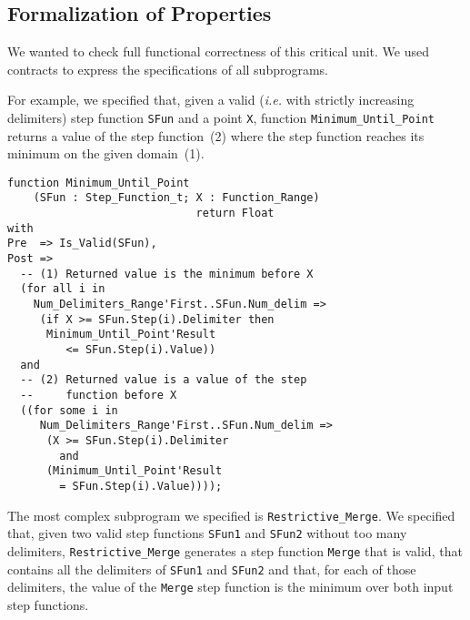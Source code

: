 \documentclass[10pt,a4paper,twocolumn]{article}
\newcommand{\ie}{\textit{i.e.}\xspace}
\newcommand{\SPARK}[1]{\lstinline[language=Ada,basicstyle={\footnotesize
      \sffamily},framesep=0pt]$#1$}
\begin{document}
\subsection{Formalization of Properties}

We wanted to check full functional correctness of this critical unit. We used
contracts to express the specifications of all subprograms.

For example, we specified that, given a valid (\ie with strictly increasing
delimiters) step function \SPARK{SFun} and a point \SPARK{X}, function
\SPARK{Minimum_Until_Point} returns a value of the step function~(2) where the
step function reaches its minimum on the given domain~(1).

\begin{lstlisting}
function Minimum_Until_Point
    (SFun : Step_Function_t; X : Function_Range)
                             return Float
with
Pre  => Is_Valid(SFun),
Post =>
  -- (1) Returned value is the minimum before X
  (for all i in
    Num_Delimiters_Range'First..SFun.Num_delim =>
     (if X >= SFun.Step(i).Delimiter then
      Minimum_Until_Point'Result
         <= SFun.Step(i).Value))
  and
  -- (2) Returned value is a value of the step
  --     function before X
  ((for some i in
     Num_Delimiters_Range'First..SFun.Num_delim =>
      (X >= SFun.Step(i).Delimiter
        and
      (Minimum_Until_Point'Result
        = SFun.Step(i).Value))));
\end{lstlisting}

The most complex subprogram we specified is \SPARK{Restrictive_Merge}.  We
specified that, given two valid step functions \SPARK{SFun1} and \SPARK{SFun2}
without too many delimiters, \SPARK{Restrictive_Merge} generates a step
function \SPARK{Merge} that is valid, that contains all the delimiters of
\SPARK{SFun1} and \SPARK{SFun2} and that, for each of those delimiters,
the value of the \SPARK{Merge} step function is the minimum over both input
step functions.
\end{document}
